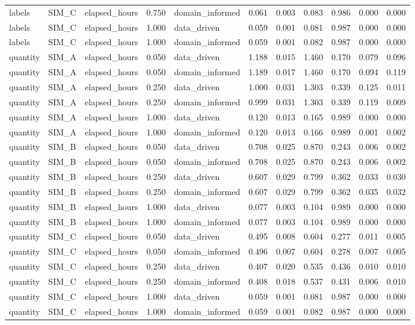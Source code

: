 \begin{table}
\begin{tabular}{lllrlrrrrrr}
labels & SIM\_C & elapsed\_hours & 0.750 & domain\_informed & 0.061 & 0.003 & 0.083 & 0.986 & 0.000 & 0.000 \\
labels & SIM\_C & elapsed\_hours & 1.000 & data\_driven & 0.059 & 0.001 & 0.081 & 0.987 & 0.000 & 0.000 \\
labels & SIM\_C & elapsed\_hours & 1.000 & domain\_informed & 0.059 & 0.001 & 0.082 & 0.987 & 0.000 & 0.000 \\
quantity & SIM\_A & elapsed\_hours & 0.050 & data\_driven & 1.188 & 0.015 & 1.460 & 0.170 & 0.079 & 0.096 \\
quantity & SIM\_A & elapsed\_hours & 0.050 & domain\_informed & 1.189 & 0.017 & 1.460 & 0.170 & 0.094 & 0.119 \\
quantity & SIM\_A & elapsed\_hours & 0.250 & data\_driven & 1.000 & 0.031 & 1.303 & 0.339 & 0.125 & 0.011 \\
quantity & SIM\_A & elapsed\_hours & 0.250 & domain\_informed & 0.999 & 0.031 & 1.303 & 0.339 & 0.119 & 0.009 \\
quantity & SIM\_A & elapsed\_hours & 1.000 & data\_driven & 0.120 & 0.013 & 0.165 & 0.989 & 0.000 & 0.000 \\
quantity & SIM\_A & elapsed\_hours & 1.000 & domain\_informed & 0.120 & 0.013 & 0.166 & 0.989 & 0.001 & 0.002 \\
quantity & SIM\_B & elapsed\_hours & 0.050 & data\_driven & 0.708 & 0.025 & 0.870 & 0.243 & 0.006 & 0.002 \\
quantity & SIM\_B & elapsed\_hours & 0.050 & domain\_informed & 0.708 & 0.025 & 0.870 & 0.243 & 0.006 & 0.002 \\
quantity & SIM\_B & elapsed\_hours & 0.250 & data\_driven & 0.607 & 0.029 & 0.799 & 0.362 & 0.033 & 0.030 \\
quantity & SIM\_B & elapsed\_hours & 0.250 & domain\_informed & 0.607 & 0.029 & 0.799 & 0.362 & 0.035 & 0.032 \\
quantity & SIM\_B & elapsed\_hours & 1.000 & data\_driven & 0.077 & 0.003 & 0.104 & 0.989 & 0.000 & 0.000 \\
quantity & SIM\_B & elapsed\_hours & 1.000 & domain\_informed & 0.077 & 0.003 & 0.104 & 0.989 & 0.000 & 0.000 \\
quantity & SIM\_C & elapsed\_hours & 0.050 & data\_driven & 0.495 & 0.008 & 0.604 & 0.277 & 0.011 & 0.005 \\
quantity & SIM\_C & elapsed\_hours & 0.050 & domain\_informed & 0.496 & 0.007 & 0.604 & 0.278 & 0.007 & 0.005 \\
quantity & SIM\_C & elapsed\_hours & 0.250 & data\_driven & 0.407 & 0.020 & 0.535 & 0.436 & 0.010 & 0.010 \\
quantity & SIM\_C & elapsed\_hours & 0.250 & domain\_informed & 0.408 & 0.018 & 0.537 & 0.431 & 0.006 & 0.010 \\
quantity & SIM\_C & elapsed\_hours & 1.000 & data\_driven & 0.059 & 0.001 & 0.081 & 0.987 & 0.000 & 0.000 \\
quantity & SIM\_C & elapsed\_hours & 1.000 & domain\_informed & 0.059 & 0.001 & 0.082 & 0.987 & 0.000 & 0.000 \\
\bottomrule
\end{tabular}
\end{table}
